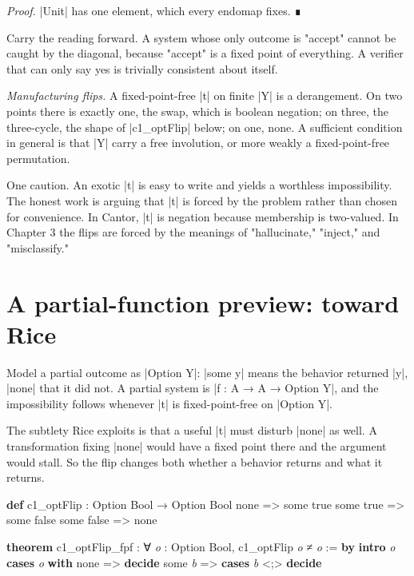 \documentclass{memoir}
\begin{document}
\emph{Proof.} \LeanVerb|Unit| has one element, which every endomap fixes. ∎

Carry the reading forward. A system whose only outcome is "accept" cannot be
caught by the diagonal, because "accept" is a fixed point of everything. A
verifier that can only say yes is trivially consistent about itself.

\emph{Manufacturing flips.} A fixed-point-free \LeanVerb|t| on finite \LeanVerb|Y| is a derangement. On
two points there is exactly one, the swap, which is boolean negation; on three,
the three-cycle, the shape of \LeanVerb|c1_optFlip| below; on one, none. A sufficient
condition in general is that \LeanVerb|Y| carry a free involution, or more weakly a
fixed-point-free permutation.

One caution. An exotic \LeanVerb|t| is easy to write and yields a worthless
impossibility. The honest work is arguing that \LeanVerb|t| is forced by the problem
rather than chosen for convenience. In Cantor, \LeanVerb|t| is negation because
membership is two-valued. In Chapter 3 the flips are forced by the meanings of
"hallucinate," "inject," and "misclassify."



\section{A partial-function preview: toward Rice}\label{Two--Schemas--of--Impossibility-005F-005F-005F--Machine--Checked--Limits--of--Trustworthy--Machine--Learning-005F-005F-005F--and--Why--They--Tighten--with--Capability----The--Diagonal----A--partial--function--preview-005F-005F-005F--toward--Rice}

Model a partial outcome as \LeanVerb|Option Y|: \LeanVerb|some y| means the behavior returned \LeanVerb|y|,
\LeanVerb|none| that it did not. A partial system is \LeanVerb|f : A → A → Option Y|, and the
impossibility follows whenever \LeanVerb|t| is fixed-point-free on \LeanVerb|Option Y|.

The subtlety Rice exploits is that a useful \LeanVerb|t| must disturb \LeanVerb|none| as well. A
transformation fixing \LeanVerb|none| would have a fixed point there and the argument
would stall. So the flip changes both whether a behavior returns and what it
returns.

\begin{LeanVerbatim}
\textbf{def} c1_optFlip : Option Bool → Option Bool
   none => some true
   some true => some false
   some false => none

\textbf{theorem} c1_optFlip_fpf :
    ∀ \textit{o} : Option Bool, c1_optFlip \textit{o} ≠ \textit{o} := \textbf{by}
  \textbf{intro} \textit{o}
  \textbf{cases} \textit{o} \textbf{with}
   none => \textbf{decide}
   some \textit{b} => \textbf{cases} \textit{b} <;> \textbf{decide}

\end{LeanVerbatim}
\end{document}
